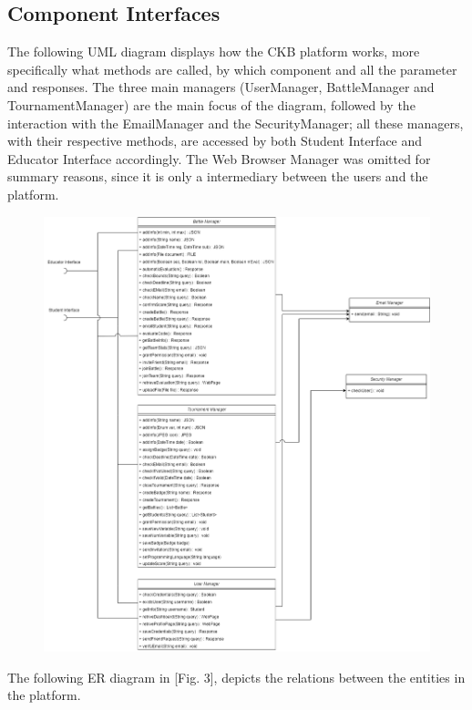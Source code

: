 \documentclass[12pt,oneside,a4paper]{article}
\begin{document}
\clearpage

\subsection{Component Interfaces}
The following UML diagram displays how the CKB platform works, more specifically what methods are called, by which component and all the parameter and responses. The three main managers (UserManager, BattleManager and TournamentManager) are the main focus of the diagram, followed by the interaction with the EmailManager and the SecurityManager; all these managers, with their respective methods, are accessed by both Student Interface and Educator Interface accordingly. The Web Browser Manager was omitted for summary reasons, since it is only a intermediary between the users and the platform.

\begin{figure}[htbp]
    \centering
    \includegraphics[scale=0.39]{Images/Diagrams/ComponentInterfaces.png}
\end{figure}

\clearpage

\begin{flushleft}
The following ER diagram in [Fig. 3], depicts the relations between the entities in the platform.
\end{flushleft}
\end{document}
